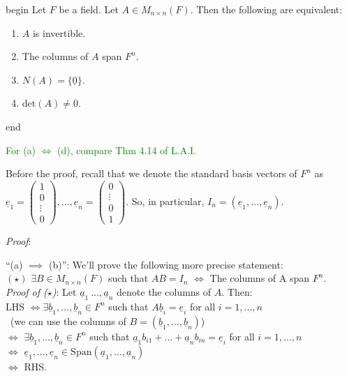 \documentclass[
  12pt,
  a4paper,
  twoside]{article}
\providecommand{\tightlist}{%
  \setlength{\itemsep}{0pt}\setlength{\parskip}{0pt}}
\theoremstyle{plain}
\theoremstyle{definition}
\begin{document}
\csname begin\label{cnj:thm-detiff}
Let \(F\) be a field. Let \(A \in M_{n \times n}(F)\). Then the following are equivalent:

\begin{enumerate}
\def\labelenumi{(\alph{enumi})}
\tightlist
\item
  \(A\) is invertible.
\item
  The columns of \(A\) span \(F^{n}\).
\item
  \(N(A) = \{ \underline{0} \}\).
\item
  \(\mathrm{det}(A) \neq 0\).
\end{enumerate}

\csname end

\textcolor{green}{For (a) $\iff$ (d), compare Thm 4.14 of L.A.I.}

Before the proof, recall that we denote the standard basis vectors of \(F^n\) as \(\underline{e}_{1} = \begin{pmatrix} 1 \\ 0 \\ \vdots \\ 0 \end{pmatrix}, \dots , \underline{e}_n = \begin{pmatrix} 0 \\ \vdots \\ 0 \\ 1 \end{pmatrix}\). So, in particular, \(I_n=(\underline{e}_{1}, \dots , \underline{e}_{n})\).

\newpage

\emph{Proof}:

``(a) \(\implies\) (b)'': We'll prove the following more precise statement:\\
\((\star)\) \(\exists B \in M_{n \times n}(F)\) such that \(AB = I_{n}\) \(\iff\) The columns of A span \(F^n\).\\
\emph{Proof of (\(\star\))}: Let \(\underline{a}_{1}\ \ldots , \underline{a}_{n}\) denote the columns of \(A\). Then:\\
LHS \(\iff \exists \underline{b}_{1}, \ldots, \underline{b}_{n} \in F^{n}\) such that \(A \underline{b}_{i} = \underline{e}_{i}\) for all \(i=1, \dots, n\)\\
\hspace*{0.333em}\hfill~{(we can use the columns of \(B=(\underline{b}_{1}, \dots, \underline{b}_{n})\))}\\
\(\iff\) \(\exists \underline{b}_{1}, \ldots , \underline{b}_{n} \in F^{n}\) such that \(\underline{a}_{1}b_{i1} + \dots + \underline{a}_{n}b_{in} = \underline{e}_{i}\) for all \(i=1, \dots, n\)\\
\(\iff\) \(\underline{e}_{1}, \dots, \underline{e}_{n} \in \mathrm{Span}(\underline{a}_{1}, \dots, \underline{a}_{n})\)\\
\(\iff\) RHS.
\end{document}
